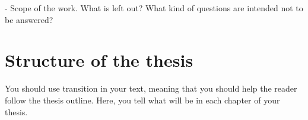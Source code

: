 - Scope of the work.
What is left out?
What kind of questions are intended not to be answered?


\section{Structure of the thesis}

You should use transition in your text, meaning that you should help
the reader follow the thesis outline. Here, you tell what will be in
each chapter of your thesis. 

